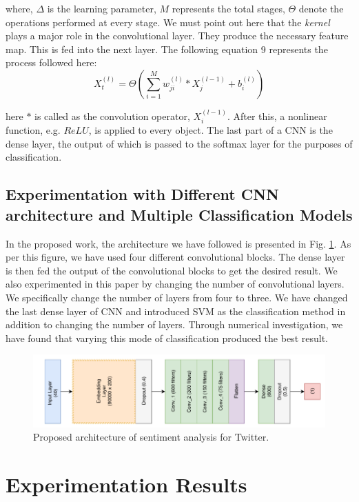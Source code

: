 where, $\Delta$ is the learning parameter, $M$ represents the total stages, $\Theta$ denote the operations performed at every stage. We  must point out here that the \textit{kernel} plays a major role in the convolutional layer. They produce the necessary feature map. This is fed into the next layer. The following equation 9 represents the process followed here:
\begin{equation}
X_t^{(l)} = \Theta\left(\sum_{i=1}^{M} w_{ji}^{(l)}\ast X_j^{(l-1)}+b_i^{(l)} \right)
\end{equation}

here $\ast$ is called as the convolution operator, $X_i^{(l-1)}$. After this, a nonlinear function, e.g. $ReLU$, is applied to every object. The last part of a CNN is the dense layer, the output of which is passed to the softmax layer for the purposes of classification.

\subsection{Experimentation with Different CNN architecture and Multiple Classification Models}

In the proposed work, the architecture we have followed is presented in Fig. \ref{proposed}. As per this figure, we have used four different convolutional blocks. The dense layer is then fed the output of the convolutional blocks to get the desired result.
We also experimented in this paper by changing the number of convolutional layers.
We specifically change the number of layers from four to three.
We have changed the last dense layer of CNN and introduced SVM as the classification method in addition to changing the number of layers. 
Through numerical investigation, we have found that varying this mode of classification produced the best result.
\begin{figure}
\centering
\includegraphics[width=\textwidth]{base.png}
\caption{Proposed architecture of sentiment analysis for Twitter.}
\label{proposed}
\end{figure}


\section{Experimentation Results}
